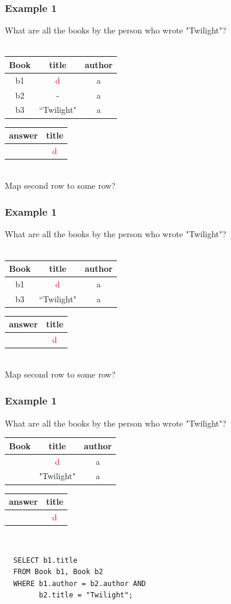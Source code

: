 \documentclass{beamer}
\begin{document}
\begin{frame}
  \frametitle{Example 1}
  What are all the books by the person who wrote "Twilight"?\\
  \hfill \\
  \begin{tabular}{ c | c c }
  Book & title & author \\
  \hline
   b1 & \textcolor{red}{d} & a \\
   b2 & -         & a \\
   b3 & ``Twilight" & a \\
  \end{tabular}
  \begin{tabular}{ c | c}
  answer & title \\
  \hline
   & \textcolor{red}{d}\\
  \end{tabular}
  \hfill \\
  Map second row to some row?
\end{frame}

\begin{frame}
  \frametitle{Example 1}
  What are all the books by the person who wrote "Twilight"?\\
  \hfill \\
  \begin{tabular}{ c | c c }
  Book & title & author \\
  \hline
   b1 & \textcolor{red}{d} & a \\
   b3 & ``Twilight" & a \\
  \end{tabular}
  \begin{tabular}{ c | c}
  answer & title \\
  \hline
   & \textcolor{red}{d}\\
  \end{tabular}
  \hfill \\
  Map second row to some row?
\end{frame}

\begin{frame}[fragile]
  \frametitle{Example 1}
  What are all the books by the person who wrote "Twilight"?\\
  \begin{tabular}{ c | c c }
  Book & title & author \\
  \hline
   & \textcolor{red}{d} & a \\
   & "Twilight" & a \\
  \end{tabular}
  \begin{tabular}{ c | c}
  answer & title \\
  \hline
   & \textcolor{red}{d}\\
  \end{tabular}
  \hfill \\
\begin{verbatim}
  SELECT b1.title
  FROM Book b1, Book b2
  WHERE b1.author = b2.author AND
        b2.title = "Twilight";
\end{verbatim}        
\end{frame}
\end{document}
